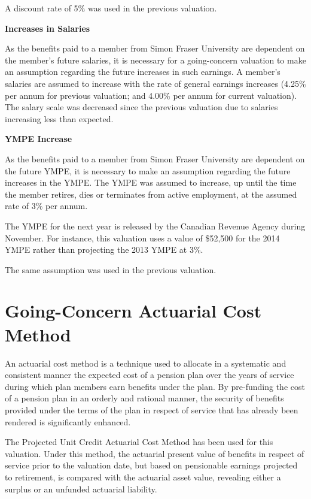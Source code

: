 \documentclass{report}
\begin{document}
\vspace{3mm}
A discount rate of  5\% was used in the previous valuation.

\vspace{3mm}
\textbf{Increases in Salaries}

As the benefits paid to a member from Simon Fraser University are dependent on the member's future salaries, it is necessary for a going-concern valuation to make an assumption regarding the future increases in such earnings. A member's salaries are assumed to increase with the rate of general earnings increases (4.25\% per annum for previous valuation; and 4.00\% per annum for current valuation). The salary scale was decreased since the previous valuation due to salaries increasing less than expected.

\vspace{3mm}
\textbf{YMPE Increase}

As the benefits paid to a member from Simon Fraser University are dependent on the future YMPE, it is necessary to make an assumption regarding the future increases in the YMPE. The YMPE was assumed to increase, up until the time the member retires, dies or terminates from active employment, at the assumed rate of 3\% per annum.

\vspace{3mm}
The YMPE for the next year is released by the Canadian Revenue Agency during November. For instance, this valuation uses a value of \$52,500 for the 2014 YMPE rather than projecting the 2013 YMPE at 3\%.

\vspace{3mm}
The same assumption was used in the previous valuation.

\section{Going-Concern Actuarial Cost Method}

An actuarial cost method is a technique used to allocate in a systematic and consistent manner the expected cost of a pension plan over the years of service during which plan members earn benefits under the plan. By pre-funding the cost of a pension plan in an orderly and rational manner, the security of benefits provided under the terms of the plan in respect of service that has already been rendered is significantly enhanced.

\vspace{3mm}
The Projected Unit Credit Actuarial Cost Method has been used for this valuation. Under this method, the actuarial present value of benefits in respect of service prior to the valuation date, but based on pensionable earnings projected to retirement, is compared with the actuarial asset value, revealing either a surplus or an unfunded actuarial liability.
\end{document}
